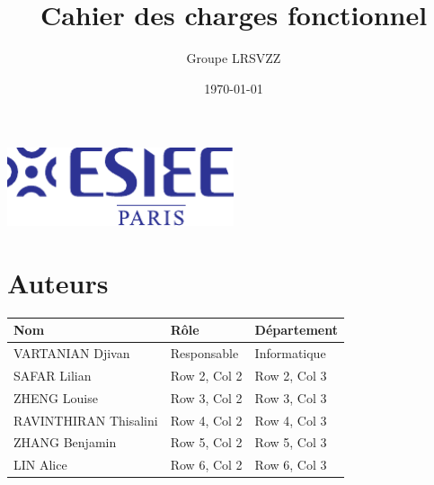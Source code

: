 \documentclass[a4paper,12pt]{report}  %
\title{Cahier des charges fonctionnel}
\author{Groupe LRSVZZ}
\date{\today}
\begin{document}
	

	\begin{titlepage}
		\centering
		\vspace*{9cm} 
		{\LARGE \bfseries \thetitle \par}
		\vspace{1cm} 
		\large \theauthor \par
		\vspace{0.5cm} 
		\large \thedate \par
		\vspace{5cm} 
		\includegraphics[width=0.5\textwidth]{../Design/FichiersPoster/Logo_ESIEE.pdf} 
		\vfill 
	\end{titlepage}
	
	
	
	\section*{Auteurs}
	
	\renewcommand{\arraystretch}{1.5}  %
	\begin{table}[h]
		\begin{tabularx}{\textwidth}{|X|X|X|}  %
			\hline
			\textbf{Nom} & \textbf{Rôle} & \textbf{Département} \\
			\hline
			VARTANIAN Djivan & Responsable & Informatique \\
			\hline
			SAFAR Lilian & Row 2, Col 2 & Row 2, Col 3 \\
			\hline
			ZHENG Louise & Row 3, Col 2 & Row 3, Col 3 \\
			\hline
			RAVINTHIRAN Thisalini & Row 4, Col 2 & Row 4, Col 3 \\
			\hline
			ZHANG Benjamin & Row 5, Col 2 & Row 5, Col 3 \\
			\hline
			LIN Alice & Row 6, Col 2 & Row 6, Col 3 \\
			\hline
		\end{tabularx}
	\end{table}
	
\end{document}
